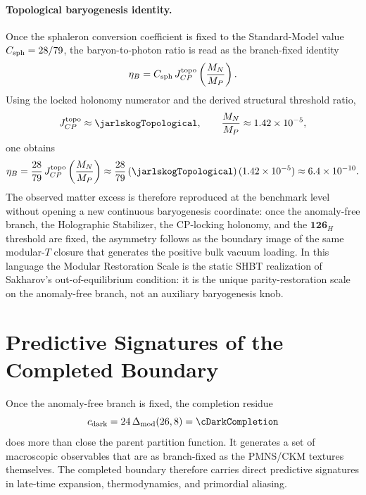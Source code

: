 \documentclass[11pt]{article}
\begin{document}
\paragraph{Topological baryogenesis identity.}
Once the sphaleron conversion coefficient is fixed to the Standard-Model value
$C_{\rm sph}=28/79$, the baryon-to-photon ratio is read as the branch-fixed
identity
\begin{equation}
 \eta_B
 =
 C_{\rm sph}\,J_{CP}^{\rm topo}\left(\frac{M_N}{M_P}\right).
\end{equation}
Using the locked holonomy numerator and the derived structural threshold ratio,
\begin{equation}
 J_{CP}^{\rm topo}\approx\jarlskogTopological,
 \qquad
 \frac{M_N}{M_P}\approx1.42\times10^{-5},
\end{equation}
one obtains
\begin{equation}
 \eta_B
 =
 \frac{28}{79}\,J_{CP}^{\rm topo}\left(\frac{M_N}{M_P}\right)
 \approx
 \frac{28}{79}\,(\jarlskogTopological)\,(1.42\times10^{-5})
 \approx 6.4\times10^{-10}.
\end{equation}
The observed matter excess is therefore reproduced at the benchmark level
without opening a new continuous baryogenesis coordinate: once the anomaly-free
branch, the Holographic Stabilizer, the CP-locking holonomy, and the
$\mathbf{126}_H$ threshold are fixed, the asymmetry follows as the boundary
image of the same modular-$T$ closure that generates the positive bulk vacuum
loading. In this language the Modular Restoration Scale is the static SHBT
realization of Sakharov's out-of-equilibrium condition: it is the unique
parity-restoration scale on the anomaly-free branch, not an auxiliary
baryogenesis knob.

\section{Predictive Signatures of the Completed Boundary}\label{sec:predictive-signatures}

Once the anomaly-free branch is fixed, the completion residue
\begin{equation}
 c_{\rm dark}=24\,\Delta_{\rm mod}(26,8)=\cDarkCompletion
\end{equation}
does more than close the parent partition function. It generates a set of
macroscopic observables that are as branch-fixed as the PMNS/CKM textures
themselves. The completed boundary therefore carries direct predictive
signatures in late-time expansion, thermodynamics, and primordial aliasing.
\end{document}
